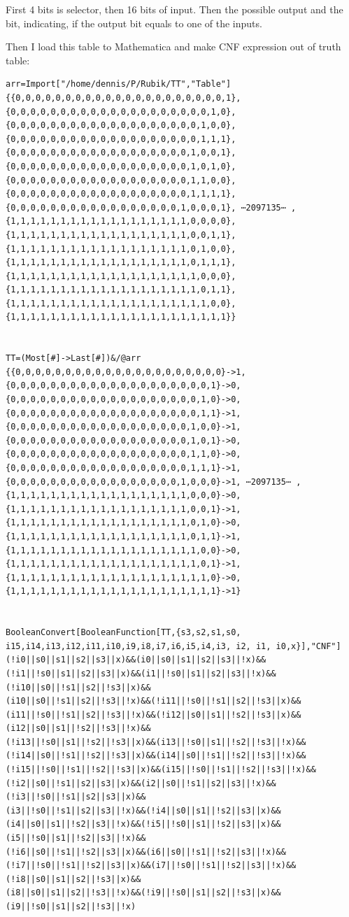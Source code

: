 First 4 bits is selector, then 16 bits of input.
Then the possible output and the bit, indicating, if the output bit equals to one of the inputs.

Then I load this table to Mathematica and make CNF expression out of truth table:

\begin{lstlisting}
arr=Import["/home/dennis/P/Rubik/TT","Table"]
{{0,0,0,0,0,0,0,0,0,0,0,0,0,0,0,0,0,0,0,0,0,1},{0,0,0,0,0,0,0,0,0,0,0,0,0,0,0,0,0,0,0,0,1,0},{0,0,0,0,0,0,0,0,0,0,0,0,0,0,0,0,0,0,0,1,0,0},
{0,0,0,0,0,0,0,0,0,0,0,0,0,0,0,0,0,0,0,1,1,1},{0,0,0,0,0,0,0,0,0,0,0,0,0,0,0,0,0,0,1,0,0,1},{0,0,0,0,0,0,0,0,0,0,0,0,0,0,0,0,0,0,1,0,1,0},
{0,0,0,0,0,0,0,0,0,0,0,0,0,0,0,0,0,0,1,1,0,0},{0,0,0,0,0,0,0,0,0,0,0,0,0,0,0,0,0,0,1,1,1,1},{0,0,0,0,0,0,0,0,0,0,0,0,0,0,0,0,0,1,0,0,0,1}, ⋯2097135⋯ ,
{1,1,1,1,1,1,1,1,1,1,1,1,1,1,1,1,1,1,0,0,0,0},{1,1,1,1,1,1,1,1,1,1,1,1,1,1,1,1,1,1,0,0,1,1},{1,1,1,1,1,1,1,1,1,1,1,1,1,1,1,1,1,1,0,1,0,0},
{1,1,1,1,1,1,1,1,1,1,1,1,1,1,1,1,1,1,0,1,1,1},{1,1,1,1,1,1,1,1,1,1,1,1,1,1,1,1,1,1,1,0,0,0},{1,1,1,1,1,1,1,1,1,1,1,1,1,1,1,1,1,1,1,0,1,1},
{1,1,1,1,1,1,1,1,1,1,1,1,1,1,1,1,1,1,1,1,0,0},{1,1,1,1,1,1,1,1,1,1,1,1,1,1,1,1,1,1,1,1,1,1}}


TT=(Most[#]->Last[#])&/@arr
{{0,0,0,0,0,0,0,0,0,0,0,0,0,0,0,0,0,0,0,0,0}->1,{0,0,0,0,0,0,0,0,0,0,0,0,0,0,0,0,0,0,0,0,1}->0,{0,0,0,0,0,0,0,0,0,0,0,0,0,0,0,0,0,0,0,1,0}->0,
{0,0,0,0,0,0,0,0,0,0,0,0,0,0,0,0,0,0,0,1,1}->1,{0,0,0,0,0,0,0,0,0,0,0,0,0,0,0,0,0,0,1,0,0}->1,{0,0,0,0,0,0,0,0,0,0,0,0,0,0,0,0,0,0,1,0,1}->0,
{0,0,0,0,0,0,0,0,0,0,0,0,0,0,0,0,0,0,1,1,0}->0,{0,0,0,0,0,0,0,0,0,0,0,0,0,0,0,0,0,0,1,1,1}->1,{0,0,0,0,0,0,0,0,0,0,0,0,0,0,0,0,0,1,0,0,0}->1, ⋯2097135⋯ ,
{1,1,1,1,1,1,1,1,1,1,1,1,1,1,1,1,1,1,0,0,0}->0,{1,1,1,1,1,1,1,1,1,1,1,1,1,1,1,1,1,1,0,0,1}->1,{1,1,1,1,1,1,1,1,1,1,1,1,1,1,1,1,1,1,0,1,0}->0,
{1,1,1,1,1,1,1,1,1,1,1,1,1,1,1,1,1,1,0,1,1}->1,{1,1,1,1,1,1,1,1,1,1,1,1,1,1,1,1,1,1,1,0,0}->0,{1,1,1,1,1,1,1,1,1,1,1,1,1,1,1,1,1,1,1,0,1}->1,
{1,1,1,1,1,1,1,1,1,1,1,1,1,1,1,1,1,1,1,1,0}->0,{1,1,1,1,1,1,1,1,1,1,1,1,1,1,1,1,1,1,1,1,1}->1}


BooleanConvert[BooleanFunction[TT,{s3,s2,s1,s0, i15,i14,i13,i12,i11,i10,i9,i8,i7,i6,i5,i4,i3, i2, i1, i0,x}],"CNF"]
(!i0||s0||s1||s2||s3||x)&&(i0||s0||s1||s2||s3||!x)&&(!i1||!s0||s1||s2||s3||x)&&(i1||!s0||s1||s2||s3||!x)&&(!i10||s0||!s1||s2||!s3||x)&&
(i10||s0||!s1||s2||!s3||!x)&&(!i11||!s0||!s1||s2||!s3||x)&&(i11||!s0||!s1||s2||!s3||!x)&&(!i12||s0||s1||!s2||!s3||x)&&(i12||s0||s1||!s2||!s3||!x)&&
(!i13||!s0||s1||!s2||!s3||x)&&(i13||!s0||s1||!s2||!s3||!x)&&(!i14||s0||!s1||!s2||!s3||x)&&(i14||s0||!s1||!s2||!s3||!x)&&
(!i15||!s0||!s1||!s2||!s3||x)&&(i15||!s0||!s1||!s2||!s3||!x)&&(!i2||s0||!s1||s2||s3||x)&&(i2||s0||!s1||s2||s3||!x)&&(!i3||!s0||!s1||s2||s3||x)&&
(i3||!s0||!s1||s2||s3||!x)&&(!i4||s0||s1||!s2||s3||x)&&(i4||s0||s1||!s2||s3||!x)&&(!i5||!s0||s1||!s2||s3||x)&&(i5||!s0||s1||!s2||s3||!x)&&
(!i6||s0||!s1||!s2||s3||x)&&(i6||s0||!s1||!s2||s3||!x)&&(!i7||!s0||!s1||!s2||s3||x)&&(i7||!s0||!s1||!s2||s3||!x)&&(!i8||s0||s1||s2||!s3||x)&&
(i8||s0||s1||s2||!s3||!x)&&(!i9||!s0||s1||s2||!s3||x)&&(i9||!s0||s1||s2||!s3||!x)
\end{lstlisting}


